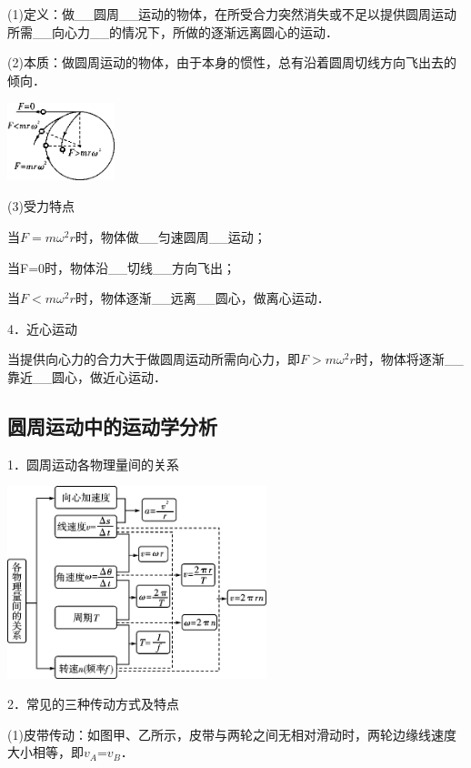(1)定义：做\_\_圆周\_\_运动的物体，在所受合力突然消失或不足以提供圆周运动所需\_\_向心力\_\_的情况下，所做的逐渐远离圆心的运动．

(2)本质：做圆周运动的物体，由于本身的惯性，总有沿着圆周切线方向飞出去的倾向．

\begin{center}\includegraphics[width=1.23333in,height=0.9in]{media/image178.png}\end{center}

(3)受力特点

当$F=mω^2r$时，物体做\_\_匀速圆周\_\_运动；

当F=0时，物体沿\_\_切线\_\_方向飞出；

当$F<mω^2r$时，物体逐渐\_\_远离\_\_圆心，做离心运动．

4．近心运动

当提供向心力的合力大于做圆周运动所需向心力，即$F>mω^2r$时，物体将逐渐\_\_靠近\_\_圆心，做近心运动．

\newpage
\subsection{圆周运动中的运动学分析}

1．圆周运动各物理量间的关系

\begin{center}\includegraphics[width=2.96667in,height=2.2in]{media/image180.png}\end{center}

2．常见的三种传动方式及特点

(1)皮带传动：如图甲、乙所示，皮带与两轮之间无相对滑动时，两轮边缘线速度大小相等，即$v_A$=$v_B$．

